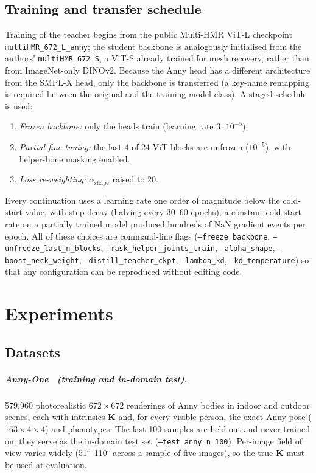 \section{Training and transfer schedule}
\label{sec:schedule}

Training of the teacher begins from the public Multi-HMR ViT-L checkpoint
\texttt{multiHMR\_672\_L\_anny}; the student backbone is analogously initialised
from the authors' \texttt{multiHMR\_672\_S}, a ViT-S already trained for mesh
recovery, rather than from ImageNet-only DINOv2. Because the Anny
head has a different architecture from the SMPL-X head, only the backbone is
transferred (a key-name remapping is required between the original and the
training model class). A staged schedule is used:
\begin{enumerate}
  \item \emph{Frozen backbone:} only the heads train (learning rate $3{\cdot}10^{-5}$).
  \item \emph{Partial fine-tuning:} the last 4 of 24 ViT blocks are unfrozen
        ($10^{-5}$), with helper-bone masking enabled.
  \item \emph{Loss re-weighting:} $\alpha_{\text{shape}}$ raised to 20.
\end{enumerate}
Every continuation uses a learning rate one order of magnitude below the
cold-start value, with step decay (halving every 30--60 epochs); a constant
cold-start rate on a partially trained model produced hundreds of NaN gradient
events per epoch. All of these choices are command-line flags
(\texttt{--freeze\_backbone}, \texttt{--unfreeze\_last\_n\_blocks},
\texttt{--mask\_helper\_joints\_train}, \texttt{--alpha\_shape},
\texttt{--boost\_neck\_weight}, \texttt{--distill\_teacher\_ckpt},
\texttt{--lambda\_kd}, \texttt{--kd\_temperature}) so that any configuration can
be reproduced without editing code.

\chapter{Experiments}
\label{ch:experiments}

\section{Datasets}

\paragraph{Anny-One~\cite{bregier2025anny} (training and in-domain test).}
579,960 photorealistic $672{\times}672$ renderings of Anny bodies in indoor and
outdoor scenes, each with intrinsics $\mathbf{K}$ and, for every visible person,
the exact Anny pose ($163{\times}4{\times}4$) and phenotypes. The last 100
samples are held out and never trained on; they serve as the in-domain test set
(\texttt{--test\_anny\_n 100}). Per-image field of view varies widely
(51$^\circ$--110$^\circ$ across a sample of five images), so the true
$\mathbf{K}$ must be used at evaluation.

